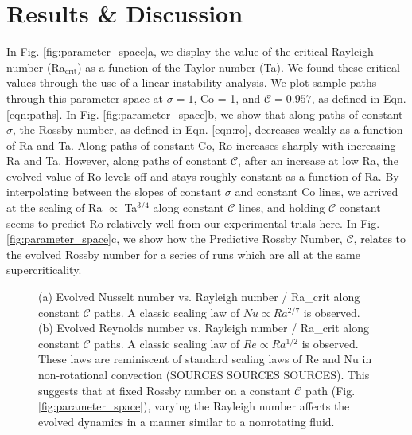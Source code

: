 \documentclass[twocolumn, amsmath, amsfonts, amssymb]{aastex62}
\begin{document}
\section{Results \& Discussion}
\label{sec:results}
In Fig. \ref{fig:parameter_space}a, we display the value of the critical Rayleigh number 
(Ra$_{\text{crit}}$) as a function of the Taylor number (Ta). We found these critical
values through the use of a linear instability analysis. We plot sample paths through
this parameter space at $\sigma = 1$, Co = 1, and $\mathcal{C} = 0.957$, as defined in 
Eqn. \ref{eqn:paths}. In Fig. \ref{fig:parameter_space}b, we show that along paths of
constant $\sigma$, the Rossby number, as defined in Eqn. \ref{eqn:ro},
decreases weakly as a function of Ra and Ta. Along paths of constant Co, Ro increases
sharply with increasing Ra and Ta. However, along paths of constant $\mathcal{C}$, 
after an increase at low Ra, the evolved value of Ro levels off and stays roughly constant
as a function of Ra. By interpolating between the slopes of constant $\sigma$ and
constant Co lines, we arrived at the scaling of Ra $\propto$ Ta$^{3/4}$ along constant
$\mathcal{C}$ lines, and holding $\mathcal{C}$ constant seems to predict Ro relatively
well from our experimental trials here. In Fig. \ref{fig:parameter_space}c, we
show how the Predictive Rossby Number, $\mathcal{C}$, relates to the evolved Rossby
number for a series of runs which are all at the same supercriticality.


\begin{figure}[h]
\caption{(a) Evolved Nusselt number vs. Rayleigh number / Ra\_crit along constant
$\mathcal{C}$ paths. A classic scaling law of $Nu \propto Ra^{2/7}$ is observed.
(b) Evolved Reynolds number vs. Rayleigh number / Ra\_crit along constant $\mathcal{C}$ paths.
A classic scaling law of $Re \propto Ra^{1/2}$ is observed. These laws are
reminiscent of standard scaling laws of Re and Nu in non-rotational convection
(SOURCES SOURCES SOURCES). This suggests that at fixed Rossby number on
a constant $\mathcal{C}$ path (Fig. \ref{fig:parameter_space}), varying the Rayleigh
number affects the evolved dynamics in a manner similar to a nonrotating fluid.
\label{fig:nu_and_re} }
\end{figure}
\end{document}

